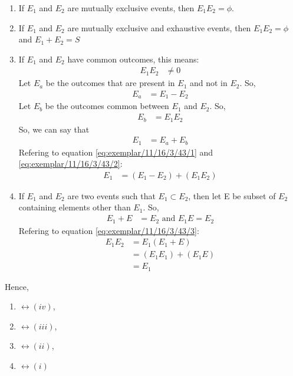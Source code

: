 \begin{enumerate}
	\item If $E_1$ and $E_2$ are mutually exclusive events, then $E_1E_2 = \phi$.\\
	\item If $E_1$ and $E_2$ are mutually exclusive and exhaustive events, then $ E_1 E_2 = \phi $ and $ E_1 + E_2=S $ \\
	\item If $E_1$ and $E_2$ have common outcomes, this means:
\begin{align}
	E_1E_2&\neq0
\end{align}
Let $E_a$ be the outcomes that are present in $E_1$ and not in $E_2$. So,
\begin{align}
	E_a&=E_1-E_2 \label{eq:exemplar/11/16/3/43/1}
\end{align}
Let $E_b$ be the outcomes common between $E_1$ and $E_2$. So,
\begin{align}
	E_b&=E_1E_2 \label{eq:exemplar/11/16/3/43/2}
\end{align}
So, we can say that
\begin{align}
	E_1&=E_a+E_b
\end{align}
Refering to equation \eqref{eq:exemplar/11/16/3/43/1} and \eqref{eq:exemplar/11/16/3/43/2}:
\begin{align}
	E_1&=(E_1-E_2)+(E_1 E_2)
\end{align}
        \item If $E_1$ and $E_2$ are two events such that $E_1 \subset E_2$, then let E be subset of $E_2$ containing elements other than $E_1$. So,
\begin{align}
	E_1 + E &= E_2 \text{  and  } E_1 E = E_2\label{eq:exemplar/11/16/3/43/3}
\end{align}
Refering to equation \eqref{eq:exemplar/11/16/3/43/3}:
\begin{align}
	E_1 E_2 &= E_1 (E_1+E)\\
	&=(E_1 E_1)+(E_1 E)\\
	&=E_1
\end{align}
\end{enumerate}
	Hence,
\begin{multicols}{4}
\begin{enumerate}
	\item $\leftrightarrow(iv)$,\item $\leftrightarrow(iii)$,\item $\leftrightarrow(ii)$,\item $\leftrightarrow(i)$
\end{enumerate}
\end{multicols}



